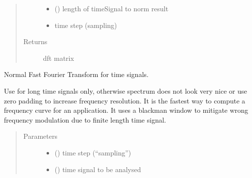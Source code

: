 \documentclass[letterpaper,10pt,english]{sphinxmanual}
\begin{document}
\begin{fulllineitems}
\begin{fulllineitems}
\begin{quote}
\begin{description}
\begin{itemize}
\item {} 
 () \textendash{} length of timeSignal to norm result

\item {} 
 \textendash{} time step (sampling)

\end{itemize}

\item[{Returns}] \leavevmode
dft matrix

\end{description}\end{quote}

\end{fulllineitems}


\begin{fulllineitems}
\label{\detokenize{FIT:FIT.FIT.fft}}
Normal Fast Fourier Transform for time signals.

Use for long time signals only, otherwise spectrum does not look very nice or use zero padding to increase frequency resolution. It is the fastest way to compute a frequency curve for an application. It uses a blackman window to mitigate wrong frequency  modulation due to finite length time signal.
\begin{quote}\begin{description}
\item[{Parameters}] \leavevmode\begin{itemize}
\item {} 
 () \textendash{} time step (“sampling”)

\item {} 
 () \textendash{} time signal to be analysed

\end{itemize}

\end{description}\end{quote}

\end{fulllineitems}


\end{fulllineitems}
\end{document}
